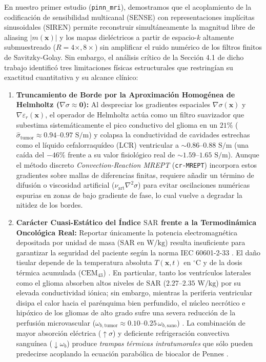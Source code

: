 \documentclass[10pt,journal,compsoc]{IEEEtran}
\begin{document}
En nuestro primer estudio (\texttt{pinn\_mri}), demostramos que el acoplamiento de la codificación de sensibilidad multicanal (SENSE) \cite{pruessmann1999sense,uecker2014espirit} con representaciones implícitas sinusoidales (SIREN) \cite{sitzmann2020implicit,raissi2019physics} permite reconstruir simultáneamente la magnitud libre de aliasing $|m(\mathbf{x})|$ y los mapas dieléctricos a partir de espacio-$k$ altamente submuestreado ($R=4\times, 8\times$) sin amplificar el ruido numérico de los filtros finitos de Savitzky-Golay. Sin embargo, el análisis crítico de la Sección 4.1 de dicho trabajo identificó tres limitaciones físicas estructurales que restringían su exactitud cuantitativa y su alcance clínico:
\begin{enumerate}
    \item \textbf{Truncamiento de Borde por la Aproximación Homogénea de Helmholtz ($\nabla\sigma \approx \mathbf{0}$):} Al despreciar los gradientes espaciales $\nabla\sigma(\mathbf{x})$ y $\nabla\varepsilon_r(\mathbf{x})$, el operador de Helmholtz actúa como un filtro suavizador que subestima sistemáticamente el pico conductivo del glioma en un $21\%$ ($\hat{\sigma}_{\text{tumor}} \approx 0.94\text{--}0.97\text{ S/m}$) y colapsa la conductividad de cavidades estrechas como el líquido cefalorraquídeo (LCR) ventricular a $\sim 0.86\text{--}0.88\text{ S/m}$ (una caída del $-46\%$ frente a su valor fisiológico real de $\sim 1.59\text{--}1.65\text{ S/m}$). Aunque el método discreto \textit{Convection-Reaction MREPT} (\texttt{cr-MREPT}) \cite{hafalir2014convection} incorpora estos gradientes sobre mallas de diferencias finitas, requiere añadir un término de difusión o viscosidad artificial ($\nu_{\text{art}}\nabla^2\sigma$) para evitar oscilaciones numéricas espurias en zonas de bajo gradiente de fase, lo cual vuelve a degradar la nitidez de los bordes.
    \item \textbf{Carácter Cuasi-Estático del Índice $\text{SAR}$ frente a la Termodinámica Oncológica Real:} Reportar únicamente la potencia electromagnética depositada por unidad de masa ($\text{SAR}$ en $\text{W/kg}$) resulta insuficiente para garantizar la seguridad del paciente según la norma IEC 60601-2-33 \cite{iec60601_2_33}. El daño tisular depende de la temperatura absoluta $T(\mathbf{x},t)$ en $^\circ\text{C}$ y de la dosis térmica acumulada ($\text{CEM}_{43}$) \cite{sapareto1984thermal}. En particular, tanto los ventrículos laterales como el glioma absorben altos niveles de $\text{SAR}$ ($2.27\text{--}2.35\text{ W/kg}$) por su elevada conductividad iónica; sin embargo, mientras la periferia ventricular disipa el calor hacia el parénquima bien perfundido, el núcleo necrótico e hipóxico de los gliomas de alto grado sufre una severa reducción de la perfusión microvascular ($\omega_{b,\text{tumor}} \approx 0.10\text{--}0.25\,\omega_{b,\text{sano}}$) \cite{vaupel1989blood}. La combinación de mayor absorción eléctrica ($\uparrow\sigma$) y deficiente refrigeración convectiva sanguínea ($\downarrow\omega_b$) produce \emph{trampas térmicas intratumorales} que sólo pueden predecirse acoplando la ecuación parabólica de biocalor de Pennes \cite{pennes1948analysis}.

\end{enumerate}
\end{document}
